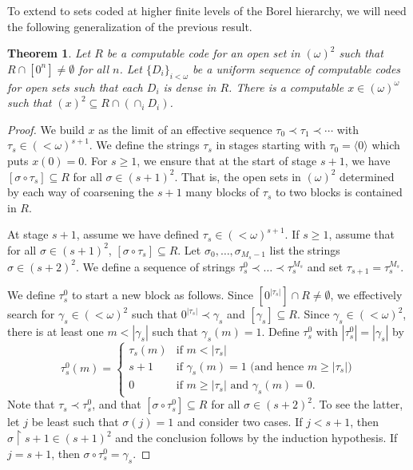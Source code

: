 \documentclass{amsart}
\newtheorem{thm}{Theorem}[section]
\theoremstyle{definition}
\theoremstyle{remark}
\newcommand{\restrict}{\upharpoonright}
\begin{document}
To extend to sets coded at higher finite levels of the Borel hierarchy, we will need the following generalization of 
the previous result. 

\begin{thm}
\label{thm:sigma1_w_density}
Let $R$ be a computable code for an open set in $(\omega)^2$ such that 
$R \cap [0^n] \neq \emptyset$ for all $n$. Let $\{D_i\}_{i<\omega}$ be a uniform sequence of computable codes for 
open sets such that each $D_i$ is dense in $R$. There is a computable $x \in (\omega)^{\omega}$ such that 
$(x)^2 \subseteq R \cap (\cap_i D_i)$.
\end{thm}

\begin{proof}
We build $x$ as the limit of an effective sequence $\tau_0 \prec \tau_1 \prec \cdots$ with $\tau_s \in (<\omega)^{s+1}$. 
We define the strings $\tau_s$ in stages starting with $\tau_0 = \langle 0 \rangle$ which puts $x(0)=0$. For $s \geq 1$, we ensure that at the start of 
stage $s+1$, we have $[\sigma \circ \tau_s] \subseteq R$ for all $\sigma \in (s+1)^2$. 
That is, the open sets in $(\omega)^2$ determined by each way of coarsening the $s+1$ many blocks of $\tau_s$ to two blocks is contained in $R$. 

At stage $s+1$, assume we have defined $\tau_s \in (<\omega)^{s+1}$. If $s \geq 1$, assume that for all 
$\sigma \in (s+1)^2$, $[\sigma \circ \tau_s] \subseteq R$. Let $\sigma_0, \ldots, \sigma_{M_s-1}$ list the strings 
$\sigma \in (s+2)^2$. We define a sequence of strings $\tau_s^0 \prec\dots\prec \tau_s^{M_s}$ and set 
$\tau_{s+1} = \tau_s^{M_s}$. 

We define $\tau_s^0$ to start a new block as follows. 
Since $[0^{|\tau_s|}] \cap R \neq \emptyset$, we  
effectively search for $\gamma_s \in (<\omega)^2$ such that 
$0^{|\tau_s|} \prec \gamma_s$ and $[\gamma_s] \subseteq R$. Since 
$\gamma_s \in (<\omega)^2$, there is at least one $m < |\gamma_s|$ such that $\gamma_s(m) = 1$. Define $\tau_s^0$ with 
$|\tau_s^0| = |\gamma_s|$ by 
\[
\tau_s^0(m) = 
\left\{
\begin{array}{ll}
\tau_s(m) & \text{if } m < |\tau_s| \\
s+1 & \text{if } \gamma_s(m) = 1 \text{ (and hence } m \geq  |\tau_s| \text{)} \\
0 & \text{if } m \geq |\tau_s| \text{ and } \gamma_s(m) = 0.
\end{array}
\right.
\]
Note that $\tau_s \prec \tau_s^0$, and that $[\sigma \circ \tau_s^0] \subseteq R$ 
for all $\sigma \in (s+2)^2$.  To see the latter, let $j$ be least such that $\sigma(j)=1$
and consider two cases.  If $j<s+1$, then $\sigma\restrict s+1 \in (s+1)^2$ 
and the conclusion follows by the induction hypothesis.  If $j=s+1$, 
then $\sigma \circ \tau_s^0 = \gamma_s$.


\end{proof}
\end{document}
